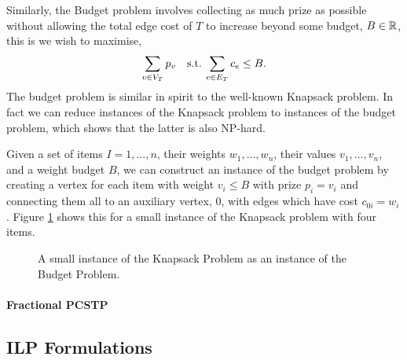 Similarly, the Budget problem involves collecting as much prize as possible without allowing the
 total edge cost of $T$ to increase beyond some budget, $B \in \mathbb{R}$, this is we wish to maximise,
 $$\sum_{v \in V_T} p_v \quad \text{s.t.} \: \sum_{e \in E_T} c_e \leq B\mathnormal{.}$$
 The budget problem is similar in spirit to the well-known Knapsack problem. In fact we can
 reduce instances of the Knapsack problem to instances of the budget problem, which shows that
  the latter is also NP-hard.

 Given a set of items $I = 1,...,n$, their weights $w_1,...,w_n$, their values $v_1,...,v_n$, and
 a weight budget $B$, we
 can construct an instance of the budget problem by creating a vertex for each item with weight
 $v_i \leq B$ with prize $p_i = v_i$ and connecting them all to an auxiliary vertex, $0$, with
 edges which have cost $c_{0i} = w_i$. Figure \ref{fig:pcstp:budget:knapsack} shows this for
  a small instance of the Knapsack problem with four items.

 \begin{figure}[h!]\centering
{}
\caption{A small instance of the Knapsack Problem as an instance of the Budget Problem.}
\label{fig:pcstp:budget:knapsack}
\end{figure}

\paragraph{Fractional PCSTP}


\subsection{ILP Formulations}
